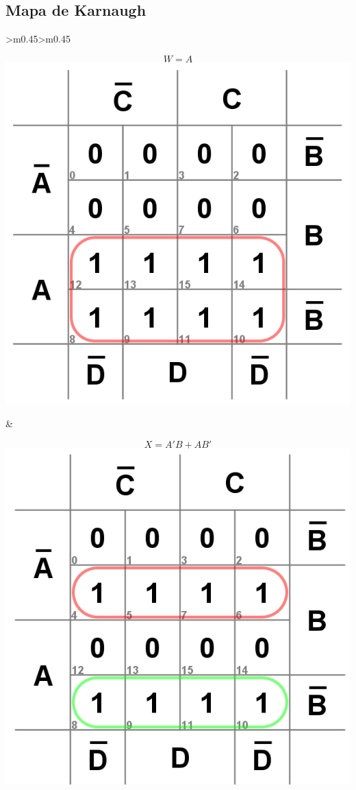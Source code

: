 \documentclass{article}
\begin{document}
\subsection{Mapa de Karnaugh}

\begin{center}
\begin{tabular}{>{\centering\arraybackslash}m{0.45\textwidth}>{\centering\arraybackslash}m{0.45\textwidth}}
\begin{minipage}[t]{\linewidth}
    \centering
    $$W = A$$
    \includegraphics[width=0.8\linewidth]{bcd2gray-W.png}
\end{minipage}
&
\begin{minipage}[t]{\linewidth}
    \centering
    $$X = A'B + AB'$$ 
    \includegraphics[width=0.8\linewidth]{bcd2gray-X.png}

\end{minipage}
\end{tabular}
\end{center}
\end{document}
